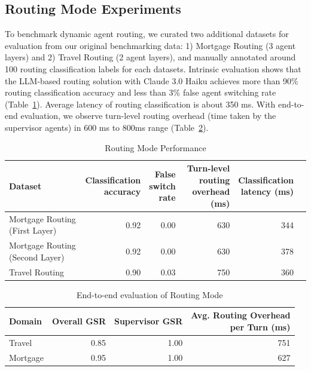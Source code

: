 \subsection{Routing Mode Experiments}


To benchmark dynamic agent routing, we curated two additional datasets for evaluation from our original benchmarking data: 1) Mortgage Routing (3 agent layers) and 2) Travel Routing (2 agent layers), and manually annotated around 100 routing classification labels for each datasets. Intrinsic evaluation shows that the LLM-based routing solution with Claude 3.0 Haiku achieves more than 90\% routing classification accuracy and less than 3\% false agent switching rate (Table~\ref{tab:routing_results}). Average latency of routing classification is about 350 ms. With end-to-end evaluation, we observe turn-level routing overhead (time taken by the supervisor agents) in 600 ms to 800ms range (Table~\ref{tab:routing_results2}). 

\begin{table}[t]
    \caption{Routing Mode Performance}
    \label{tab:routing_results}
    \centering
    \footnotesize
    \begin{tabular}{lrrrrr}
    \toprule
    Dataset & \shortstack[r]{Classification \\accuracy} & \shortstack[r]{False \\ switch \\ rate} & \shortstack[r]{Turn-level \\ routing \\overhead (ms)} & \shortstack[r]{Classification \\ latency (ms)} \\
    \midrule 
    Mortgage Routing (First Layer) & 0.92 & 0.00 & 630 & 344 \\
    Mortgage Routing (Second Layer) & 0.92 & 0.00 & 630 & 378 \\
    Travel Routing & 0.90 & 0.03 & 750 & 360 \\
    \bottomrule
    \end{tabular}
\end{table}


\begin{table}[t]
    \caption{End-to-end evaluation of Routing Mode}
    \label{tab:routing_results2}
    \centering
    \footnotesize
    \begin{tabular}{lrrr}
    \toprule
    Domain    & Overall GSR & Supervisor GSR & \shortstack[r]{Avg. Routing Overhead \\ per Turn (ms)} \\
    \midrule
    Travel & 0.85 & 1.00 & 751 \\
    Mortgage & 0.95 & 1.00 & 627 \\
    \bottomrule
    \end{tabular}
\end{table}